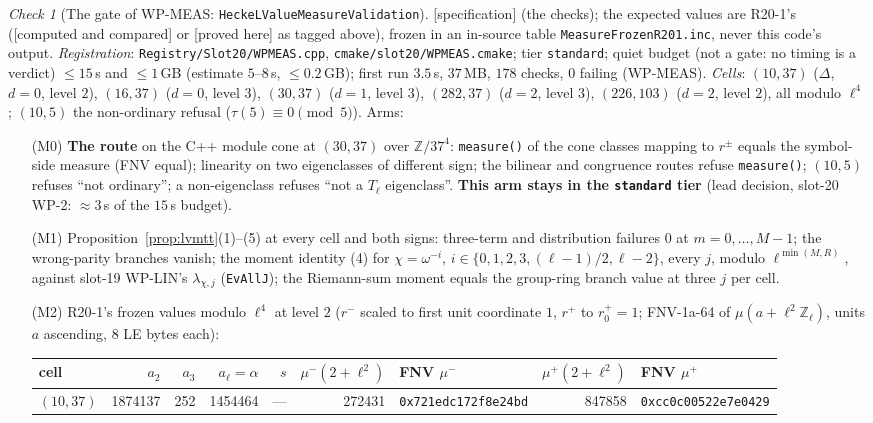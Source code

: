 \documentclass[11pt]{article}
\theoremstyle{remark}
\newtheorem{checkitem}[theorem]{Check}
\newcommand{\Z}{\mathbb{Z}}
\newcommand{\PROVED}{\textsf{[proved here]}}
\newcommand{\CMPD}{\textsf{[computed and compared]}}   %
\newcommand{\SPEC}{\textsf{[specification]}}           %
\begin{document}
\begin{checkitem}[The gate of WP-MEAS: \texttt{HeckeLValueMeasureValidation}]\label{chk:lvmeas}
\SPEC{} (the checks); the expected values are R20-1's (\CMPD{} or \PROVED{} as tagged above), frozen in an in-source table \texttt{MeasureFrozenR201.inc}, never this code's output.
\emph{Registration}: \texttt{Registry/Slot20/WPMEAS.cpp}, \texttt{cmake/slot20/WPMEAS.cmake}; tier \texttt{standard}; quiet budget (not a gate: no timing is a verdict) $\le15$\,s and $\le1$\,GB (estimate $5$--$8$\,s,
$\le0.2$\,GB); first run $3.5$\,s, $37$\,MB, $178$ checks, $0$ failing (WP-MEAS). \emph{Cells}: $(10,37)$ ($\Delta$, $d=0$, level $2$), $(16,37)$ ($d=0$, level $3$), $(30,37)$ ($d=1$, level $3$), $(282,37)$ ($d=2$, level $3$), $(226,103)$ ($d=2$,
level $2$), all modulo $\ell^{4}$; $(10,5)$ the non-ordinary refusal ($\tau(5)\equiv0\pmod5$). Arms:
\begin{enumerate}
\item[(M0)] \textbf{The route} on the C++ module cone at $(30,37)$ over $\Z/37^{4}$: \texttt{measure()} of the cone classes mapping to $r^{\pm}$ equals the symbol-side measure (FNV equal);
  linearity on two eigenclasses of different sign; the \textsf{bilinear} and \textsf{congruence} routes refuse \texttt{measure()}; $(10,5)$ refuses ``not ordinary''; a non-eigenclass
  refuses ``not a $T_\ell$ eigenclass''. \textbf{This arm stays in the \texttt{standard} tier} (lead decision, slot-20 WP-2: $\approx3$\,s of the $15$\,s budget).
\item[(M1)] Proposition~\ref{prop:lvmtt}(1)--(5) at every cell and both signs: three-term and distribution failures $0$ at $m=0,\dots,M-1$; the wrong-parity branches vanish; the moment
  identity (4) for $\chi=\omega^{-i}$, $i\in\{0,1,2,3,(\ell-1)/2,\ell-2\}$, every $j$, modulo $\ell^{\min(M,R)}$, against slot-19 WP-LIN's $\lambda_{\chi,j}$ (\texttt{EvAllJ}); the Riemann-sum
  moment equals the group-ring branch value at three $j$ per cell.
\item[(M2)] R20-1's frozen values modulo $\ell^{4}$ at level $2$ ($r^{-}$ scaled to first unit coordinate $1$, $r^{+}$ to $r^{+}_0=1$; FNV-1a-64 of $\mu(a+\ell^{2}\Z_\ell)$, units $a$
  ascending, $8$ LE bytes each):
  \begin{center}\scriptsize
  \begin{tabular}{@{}lrrrrrlrl@{}}
  \toprule
  cell & $a_2$ & $a_3$ & $a_\ell=\alpha$ & $s$ & $\mu^{-}(2+\ell^{2})$ & FNV $\mu^{-}$ & $\mu^{+}(2+\ell^{2})$ & FNV $\mu^{+}$\\
  \midrule
  $(10,37)$ & 1874137 & 252 & 1454464 & --- & 272431 & \texttt{0x721edc172f8e24bd} & 847858 & \texttt{0xcc0c00522e7e0429}\\

\end{tabular}
\end{center}
\end{enumerate}
\end{checkitem}
\end{document}
